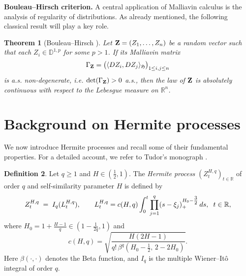 \documentclass[a4paper,10pt]{article}
\theoremstyle{definition}
\newtheorem{Def}{Definition}[section]
\theoremstyle{plain}
\newtheorem{Thm}[Def]{Theorem}
\newtheorem{Lemma}[Def]{Lemma}
\newcommand{\R}{\mathbb{R}}
\renewcommand{\P}{\mathbb{P}}
\newcommand\HHH{\mathfrak{H}}
\newcommand\D{\mathbb{D}}
\newcommand\1{\mathbbm{1}}
\begin{document}
\medskip
\noindent\textbf{Bouleau--Hirsch criterion.}  
A central application of Malliavin calculus is the analysis of regularity of distributions.  
As already mentioned, the following classical result will play a key role.

\begin{Thm}[Bouleau--Hirsch \cite{BouleauHirsch1984}]\label{Thm:2.1.2}
Let ${\bf Z}=(Z_1,\dots,Z_n)$ be a random vector such that each $Z_i\in\D^{1,p}$ for some $p>1$.  
If its Malliavin matrix
\[
\Gamma_{\bf Z} = \big(\langle DZ_i,DZ_j\rangle_\HHH\big)_{1\le i,j\le n}
\]
is a.s. non-degenerate, i.e. $\det(\Gamma_{\bf Z})>0$ a.s., then the law of ${\bf Z}$ is absolutely continuous with respect to the Lebesgue measure on $\R^n$.
\end{Thm}
%


\section{Background on Hermite processes}\label{sec:Hermite}

We now introduce Hermite processes and recall some of their fundamental properties.  
For a detailed account, we refer to Tudor’s monograph \cite{Tudor23}.

\begin{Def}\label{Def:Hermite}
Let $q\ge1$ and $H\in(\frac12,1)$.  
The \emph{Hermite process} $(Z_t^{H,q})_{t\in\R}$ of order $q$ and self-similarity parameter $H$ is defined by
\begin{equation}\label{eq:Zt}
Z_t^{H,q} \;=\; I_q(L_t^{H,q}), \qquad 
L_t^{H,q} = c(H,q)\int_0^t \prod_{j=1}^q (s-\xi_j)_{+}^{H_0-\tfrac32}\,ds, \hskip0.2cm t\in \R,
\end{equation}
where $H_0 = 1+\tfrac{H-1}{q}\in(1-\tfrac1{2q},1)$ and
\[
c(H,q) = \sqrt{\frac{H(2H-1)}{q!\,\beta^q(H_0-\tfrac12,\,2-2H_0)}}.
\]
Here $\beta(\cdot,\cdot)$ denotes the Beta function, and $I_q$ is the multiple Wiener--Itô integral of order $q$.
\end{Def}
\end{document}
